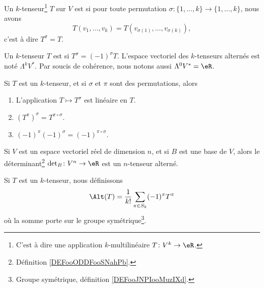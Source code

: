 \begin{definition}
	Un \( k\)-tenseur\footnote{C'est à dire une application \( k\)-multilinéaire \(T \colon V^k\to \eR  \).} \( T\) sur \( V\) est  si pour toute permutation \(\sigma \colon \{ 1,\ldots,k \}\to \{ 1,\ldots,k \}  \), nous avons
	\begin{equation}
		T(v_1,\ldots,v_k)=T(v_{\sigma(1)},\ldots,v_{\sigma(k)}),
	\end{equation}
	c'est à dire \( T^{\sigma}=T\).
\end{definition}

\begin{definition}
	Un \( k\)-tenseur \( T\) est  si \( T^{\sigma}=(-1)^{\sigma}T\). L'espace vectoriel des \( k\)-tenseurs alternés est noté \( \Lambda^kV^*\). Par soucis de cohérence, nous notons aussi \( \Lambda^0V^*=\eR\).
\end{definition}

\begin{lemma}		\label{LEMooJEZYooMmrtgu}
	Si \( T\) est un \( k\)-tenseur, et si \( \sigma\) et \( \pi\) sont des permutations, alors
	\begin{enumerate}
		\item
		      L'application \( T\mapsto T^{\sigma}\) est linéaire en \( T\).
		\item
		      \( (T^{\pi})^{\sigma}=T^{\pi\circ \sigma}\).
		\item
		      \( (-1)^{\pi}(-1)^{\sigma}=(-1)^{\pi\circ \sigma}\).
	\end{enumerate}
\end{lemma}


\begin{lemma}		\label{LEMooZMTPooKnqSuz}
	Si \( V\) est un espace vectoriel réel de dimension \( n\), et si \( B\) est une base de \( V\), alors le déterminant\footnote{Définition \ref{DEFooODDFooSNahPb}.} \(\det_B \colon V^n\to \eR  \) est un \( n\)-tenseur alterné.
\end{lemma}

\begin{definition}
	Si \( T\) est un \( k\)-tenseur, nous définissons
	\begin{equation}
		\Alt(T)=\frac{1}{ k!}\sum_{\pi\in S_k}(-1)^{\pi}T^{\pi}
	\end{equation}
	où la somme porte sur le groupe symétrique\footnote{Groupe symétrique, définition \ref{DEFooJNPIooMuzIXd}.}.
\end{definition}

